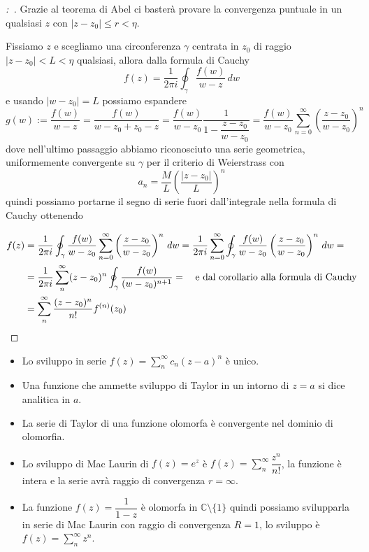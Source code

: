 \documentclass[11pt,a4paper,twoside]{book}
\newenvironment{esempio}[1][Esempio]{ 
  \begin{center}\begin{tcolorbox}[
  title={#1:~},
  width=0.9\linewidth,
  flush right,
  enhanced jigsaw, 
  colback=white, 
  frame hidden, 
  sharpish corners, arc=3mm,
  borderline west = {1pt}{0pt}{gray},
  borderline south = {1pt}{0pt}{gray},
  coltitle=black, 
  fonttitle=\small\bfseries, 
  attach title to upper, 
  breakable,
  top=2.5pt, bottom=0.3pt]\small
  }{
 \normalsize \end{tcolorbox}\end{center}
}
\newenvironment{dimo}[1][\proofname]{
	\begin{tcolorbox}[
	breakable, 
	enhanced, 
	interior hidden, 
	frame hidden, 
	borderline west = {1pt}{0pt}{gray}, 
	top=0pt, bottom=0pt, left=0pt]
\begin{proof}[#1:~]
}
{
\end{proof}
\end{tcolorbox}
}
\theoremstyle{esss}
\theoremstyle{dotless}
\numberwithin{equation}{section} %
\begin{document}
\begin{dimo}
Grazie al teorema di Abel ci basterà provare la convergenza puntuale in un qualsiasi $z$ con $|z-z_0|\leq r<\eta$. 

Fissiamo $z$ e scegliamo una circonferenza $\gamma$ centrata in $z_0$ di raggio $|z-z_0|<L<\eta$ qualsiasi, allora dalla formula di Cauchy
\[
f(z)=\dfrac{1}{2\pi i}\oint_\gamma \dfrac{f(w)}{w-z}\, dw
\]
e usando $|w-z_0|=L$ possiamo espandere \[g(w):=\dfrac{f(w)}{w-z}=\dfrac{f(w)}{w-z_0+z_0-z}=\dfrac{f(w)}{w-z_0}\dfrac{1}{1-\dfrac{z-z_0}{w-z_0}}=\dfrac{f(w)}{w-z_0}\sum_{n=0}^\infty \left(\dfrac{z-z_0}{w-z_0}\right)^n\]
dove nell'ultimo passaggio abbiamo riconosciuto una serie geometrica, uniformemente convergente su $\gamma$ per il criterio di Weierstrass con \[a_n=\dfrac{M}{L}\left(\dfrac{|z-z_0|}{L}\right)^n\]
quindi possiamo portarne il segno di serie fuori dall'integrale nella formula di Cauchy ottenendo

\begin{align*}
f(z) &=\dfrac{1}{2\pi i} \oint_\gamma \dfrac{f(w)}{w-z_0} \sum_{n=0}^\infty \left(\dfrac{z-z_0}{w-z_0}\right)^n\, dw =
\dfrac{1}{2\pi i} \sum_{n=0}^\infty \oint_\gamma \dfrac{f(w)}{w-z_0} \left(\dfrac{z-z_0}{w-z_0}\right)^n\, dw =\\
&= \dfrac{1}{2\pi i} \sum_n^\infty (z-z_0)^n \oint_\gamma \dfrac{f(w)}{(w-z_0)^{n+1}} = \quad \text{e dal corollario alla formula di Cauchy} \\ 
&= \sum_n^\infty \dfrac{(z-z_0)^n}{n!}  f^{(n)}(z_0)  \qedhere
\end{align*}

\end{dimo}


\begin{itemize}[label=$\cdot$]
\item Lo sviluppo in serie $f(z)=\sum_n^\infty  c_n (z-a)^n$ è unico.
\item Una funzione che ammette sviluppo di Taylor in un intorno di $z=a$ si dice analitica in $a$.
\item La serie di Taylor di una funzione olomorfa è convergente nel dominio di olomorfia.
\end{itemize}

\begin{esempio}
\begin{itemize}[label=$\cdot$]
\item Lo sviluppo di Mac Laurin di $f(z)=e^z$ è $f(z)=\sum_n^\infty \dfrac{z^n}{n!}$, la funzione è intera e la serie avrà raggio di convergenza $r=\infty$.
\item La funzione $f(z)=\dfrac{1}{1-z}$ è olomorfa in $\mathbb{C}\setminus\{1\}$ quindi possiamo svilupparla in serie di Mac Laurin con raggio di convergenza $R=1$, lo sviluppo è $f(z)=\sum_n^\infty z^n$.
\end{itemize}
\end{esempio}
\end{document}
